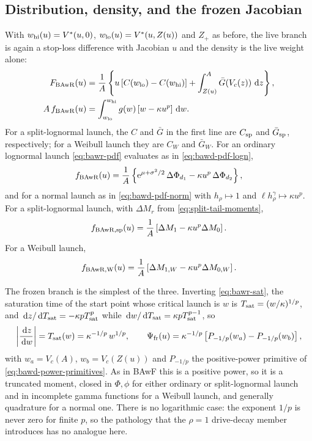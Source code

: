 \documentclass[12pt]{article}
\newcommand{\dd}{\,\mathrm{d}}
\newcommand{\PhiN}{\Phi}
\newcommand{\phiN}{\phi}
\newcommand{\Gbar}{\bar{G}}
\newcommand{\e}{\mathrm{e}}
\theoremstyle{remark}
\begin{document}
\subsection{Distribution, density, and the frozen Jacobian}
With $w_{\rm hi}(u)=V^{*}(u,0)$, $w_{\rm lo}(u)=V^{*}(u,Z(u))$ and $Z_+$ as before, the live branch is again a stop-loss difference with Jacobian $u$ and the density is the live weight alone:
\begin{align}
  F_{\rm BAwR}(u)
  &= \frac{1}{A}\left\{u\left[C(w_{\rm lo})-C(w_{\rm hi})\right]
     + \int_{Z(u)}^{A}\Gbar\!\left(V_c(z)\right)\dd z\right\},
  \label{eq:bawr-cdf}\\
  A\,f_{\rm BAwR}(u)
  &= \int_{w_{\rm lo}}^{w_{\rm hi}}
       g(w)\left[w-\kappa u^{p}\right]\dd w.
  \label{eq:bawr-pdf}
\end{align}
For a split-lognormal launch, the $C$ and $\Gbar$ in the first line are $C_{\rm sp}$ and $\Gbar_{\rm sp}$, respectively; for a Weibull launch they are $C_W$ and $\Gbar_W$. For an ordinary lognormal launch \eqref{eq:bawr-pdf} evaluates as in
\eqref{eq:bawd-pdf-logn},
\begin{equation}
  f_{\rm BAwR}(u)
  = \frac{1}{A}\left\{
      \e^{\mu+\sigma^2/2}\,\Delta\PhiN_{d_1}
      - \kappa u^{p}\,\Delta\PhiN_{d_2}\right\},
  \label{eq:bawr-pdf-logn}
\end{equation}
and for a normal launch as in \eqref{eq:bawd-pdf-norm} with $h_\rho\mapsto1$ and $\ell h_\rho^\gamma\mapsto\kappa u^{p}$. For a split-lognormal launch, with $\Delta M_r$ from
\eqref{eq:split-tail-moments},
\begin{equation}
  f_{\rm BAwR,sp}(u)
  =\frac{1}{A}\left[\Delta M_1-\kappa u^p\Delta M_0\right].
  \label{eq:bawr-pdf-split}
\end{equation}
For a Weibull launch,
\begin{equation}
  f_{\rm BAwR,W}(u)
   =\frac{1}{A}\left[\Delta M_{1,W}-\kappa u^p\Delta M_{0,W}\right].
  \label{eq:bawr-pdf-weibull}
\end{equation}

The frozen branch is the simplest of the three. Inverting
\eqref{eq:bawr-sat}, the saturation time of the start point whose critical
launch is $w$ is $T_{\rm sat}=(w/\kappa)^{1/p}$, and $\dd z/\dd T_{\rm sat}=-\kappa p T_{\rm sat}^{p}$ while $\dd w/\dd T_{\rm sat}=\kappa p T_{\rm sat}^{p-1}$, so
\begin{equation}
  \left|\frac{\dd z}{\dd w}\right| = T_{\rm sat}(w)
  = \kappa^{-1/p}\,w^{1/p},
  \qquad
  \Psi_{\rm fr}(u) = \kappa^{-1/p}
    \left[P_{-1/p}(w_a)-P_{-1/p}(w_b)\right],
  \label{eq:bawr-frozen}
\end{equation}
with $w_a=V_c(A)$, $w_b=V_c(Z(u))$ and $P_{-1/p}$ the positive-power primitive of \eqref{eq:bawd-power-primitives}. As in BAwF this is a positive power, so it is a truncated moment, closed in $\PhiN,\phiN$ for either ordinary or split-lognormal launch and in incomplete gamma functions for a Weibull launch, and generally quadrature for a normal one. There is no logarithmic case: the exponent $1/p$ is never zero for finite $p$, so the pathology that the $\rho=1$ drive-decay member introduces has no analogue here.
\end{document}
